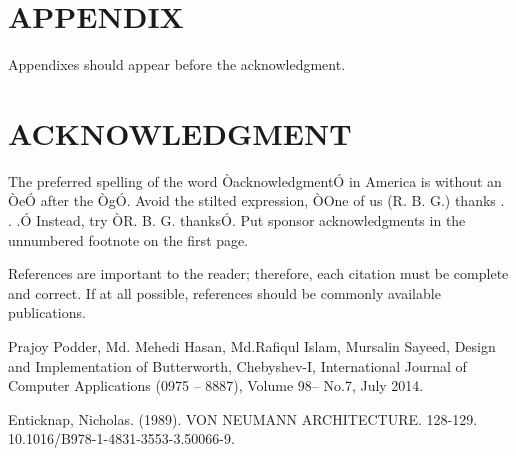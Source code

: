 \documentclass[letterpaper, 10 pt, conference]{ieeeconf}  %
\begin{document}
\addtolength{\textheight}{-12cm}   %







\section*{APPENDIX}

Appendixes should appear before the acknowledgment.

\section*{ACKNOWLEDGMENT}

The preferred spelling of the word ÒacknowledgmentÓ in America is without an ÒeÓ after the ÒgÓ. Avoid the stilted expression, ÒOne of us (R. B. G.) thanks . . .Ó  Instead, try ÒR. B. G. thanksÓ. Put sponsor acknowledgments in the unnumbered footnote on the first page.




References are important to the reader; therefore, each citation must be complete and correct. If at all possible, references should be commonly available publications.



\begin{thebibliography}{99}

 Prajoy Podder, Md. Mehedi Hasan, Md.Rafiqul Islam, Mursalin Sayeed, Design and Implementation of Butterworth, Chebyshev-I, International Journal of Computer Applications (0975 – 8887), Volume 98– No.7, July 2014.

 Enticknap, Nicholas. (1989). VON NEUMANN ARCHITECTURE. 128-129. 10.1016/B978-1-4831-3553-3.50066-9. 




\end{thebibliography}
\end{document}
